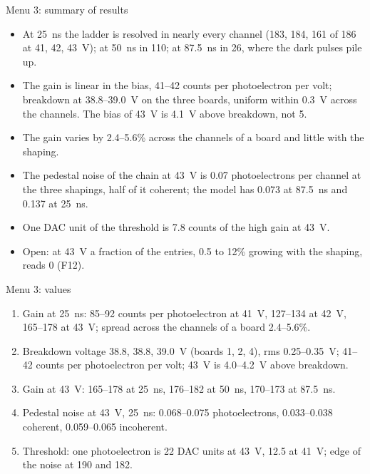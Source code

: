 \begin{frame}{Menu 3: summary of results}
\begin{itemize}
\item At 25~ns the ladder is resolved in nearly every channel (183, 184, 161 of 186 at 41,
  42, 43~V); at 50~ns in 110; at 87.5~ns in 26, where the dark pulses pile up.
\item The gain is linear in the bias, 41--42 counts per photoelectron per volt; breakdown at
  38.8--39.0~V on the three boards, uniform within 0.3~V across the channels. The bias of
  43~V is 4.1~V above breakdown, not 5.
\item The gain varies by 2.4--5.6\% across the channels of a board and little with the
  shaping.
\item The pedestal noise of the chain at 43~V is 0.07 photoelectrons per channel at the three
  shapings, half of it coherent; the model has 0.073 at 87.5~ns and 0.137 at 25~ns.
\item One DAC unit of the threshold is 7.8 counts of the high gain at 43~V.
\item Open: at 43~V a fraction of the entries, 0.5 to 12\% growing with the shaping, reads 0
  (F12).
\end{itemize}
\end{frame}

\begin{frame}{Menu 3: values}
\begin{enumerate}
\item Gain at 25~ns: 85--92 counts per photoelectron at 41~V, 127--134 at 42~V, 165--178 at
  43~V; spread across the channels of a board 2.4--5.6\%.
\item Breakdown voltage 38.8, 38.8, 39.0~V (boards 1, 2, 4), rms 0.25--0.35~V; 41--42 counts
  per photoelectron per volt; 43~V is 4.0--4.2~V above breakdown.
\item Gain at 43~V: 165--178 at 25~ns, 176--182 at 50~ns, 170--173 at 87.5~ns.
\item Pedestal noise at 43~V, 25~ns: 0.068--0.075 photoelectrons, 0.033--0.038 coherent,
  0.059--0.065 incoherent.
\item Threshold: one photoelectron is 22 DAC units at 43~V, 12.5 at 41~V; edge of the noise at
  190 and 182.
\end{enumerate}
\end{frame}

